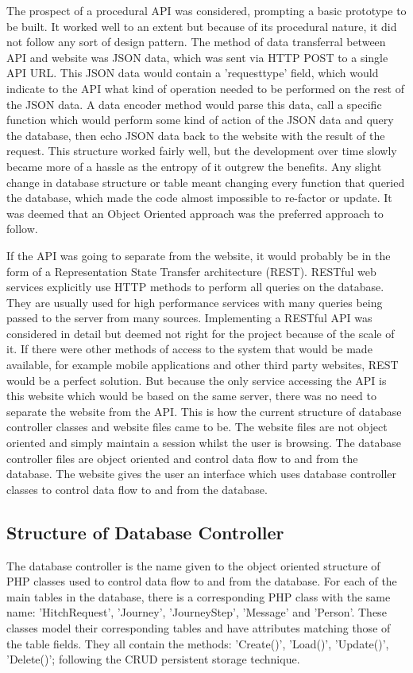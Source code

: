 		The prospect of a procedural API was considered, prompting a basic prototype to be built. It worked well to an extent but because of its procedural nature, it did not follow any sort of design pattern. The method of data transferral between API and website was JSON data, which was sent via HTTP POST to a single API URL. This JSON data would contain a 'request\textunderscore type' field, which would indicate to the API what kind of operation needed to be performed on the rest of the JSON data. A data encoder method would parse this data, call a specific function which would perform some kind of action of the JSON data and query the database, then echo JSON data back to the website with the result of the request. This structure worked fairly well, but the development over time slowly became more of a hassle as the entropy of it outgrew the benefits. Any slight change in database structure or table meant changing every function that queried the database, which made the code almost impossible to re-factor or update. It was deemed that an Object Oriented approach was the preferred approach to follow. 
		
		If the API was going to separate from the website, it would probably be in the form of a Representation State Transfer architecture (REST). RESTful web services explicitly use HTTP methods to perform all queries on the database. They are usually used for high performance services with many queries being passed to the server from many sources. Implementing a RESTful API was considered in detail but deemed not right for the project because of the scale of it. If there were other methods of access to the system that would be made available, for example mobile applications and other third party websites, REST would be a perfect solution. But because the only service accessing the API is this website which would be based on the same server, there was no need to separate the website from the API. This is how the current structure of database controller classes and website files came to be. The website files are not object oriented and simply maintain a session whilst the user is browsing. The database controller files are object oriented and control data flow to and from the database. The website gives the user an interface which uses database controller classes to control data flow to and from the database.
		
	\subsection{Structure of Database Controller}
		The database controller is the name given to the object oriented structure of PHP classes used to control data flow to and from the database. For each of the main tables in the database, there is a corresponding PHP class with the same name: 'Hitch\textunderscore Request', 'Journey', 'Journey\textunderscore Step', 'Message' and 'Person'. These classes model their corresponding tables and have attributes matching those of the table fields. They all contain the methods: 'Create()', 'Load()', 'Update()', 'Delete()'; following the CRUD persistent storage technique\cite{crud_technique}. 

